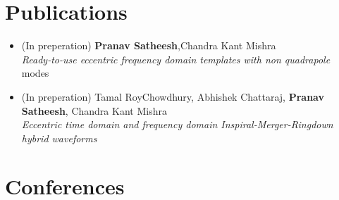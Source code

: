 \documentclass[margin, centered]{res}
\begin{document}
\begin{resume}

\section{Publications}
\begin{itemize}[leftmargin=*]
    \item (In preperation) \textbf{Pranav Satheesh},Chandra Kant Mishra\\
    \textit{Ready-to-use eccentric frequency domain templates with non quadrapole} modes
    \item (In preperation) Tamal RoyChowdhury, Abhishek Chattaraj, \textbf{Pranav Satheesh}, Chandra Kant Mishra\\
    \textit{Eccentric time domain and frequency domain Inspiral-Merger-Ringdown hybrid waveforms}
\end{itemize}



\section{Conferences}


\end{resume}
\end{document}
